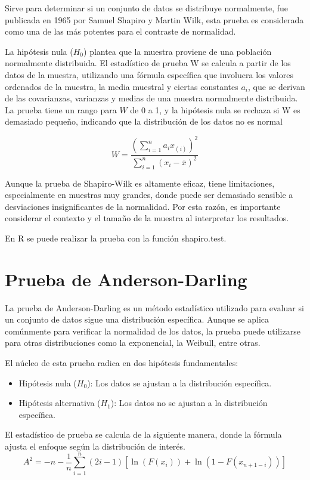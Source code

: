 \documentclass{article}
\begin{document}
Sirve para determinar si un conjunto de datos se distribuye normalmente, fue publicada en 1965 por Samuel Shapiro y Martin Wilk, esta prueba es considerada como una de las más potentes para el contraste de normalidad.

La hipótesis nula ($H_0$) plantea que la muestra proviene de una población normalmente distribuida. El estadístico de prueba W se calcula a partir de los datos de la muestra, utilizando una fórmula específica que involucra los valores ordenados de la muestra, la media muestral y ciertas constantes $a_i$, que se derivan de las covarianzas, varianzas y medias de una muestra normalmente distribuida. La prueba tiene un rango para $W$ de 0 a 1, y la hipótesis nula se rechaza si W es demasiado pequeño, indicando que la distribución de los datos no es normal

\[W = \frac{\left(\sum_{i=1}^{n}a_{i}x_{(i)}\right)^{2}}{\sum_{i=1}^{n}(x_{i}-\overline{x})^{2}}
\]

Aunque la prueba de Shapiro-Wilk es altamente eficaz, tiene limitaciones, especialmente en muestras muy grandes, donde puede ser demasiado sensible a desviaciones insignificantes de la normalidad. Por esta razón, es importante considerar el contexto y el tamaño de la muestra al interpretar los resultados.

En R se puede realizar la prueba con la función shapiro.test.

\section{Prueba de Anderson-Darling}

La prueba de Anderson-Darling es un método estadístico utilizado para evaluar si un conjunto de datos sigue una distribución específica. Aunque se aplica comúnmente para verificar la normalidad de los datos, la prueba puede utilizarse para otras distribuciones como la exponencial, la Weibull, entre otras.

El núcleo de esta prueba radica en dos hipótesis fundamentales:

\begin{itemize}
    \item Hipótesis nula (\(H_0\)): Los datos se ajustan a la distribución específica.
    \item Hipótesis alternativa (\(H_1\)): Los datos no se ajustan a la distribución específica.
\end{itemize}

El estadístico de prueba se calcula de la siguiente manera, donde la fórmula ajusta el enfoque según la distribución de interés.
\[A^2 = -n - \frac{1}{n} \sum_{i=1}^{n} (2i-1) \left[ \ln(F(x_i)) + \ln(1-F(x_{n+1-i})) \right]\]
\end{document}
